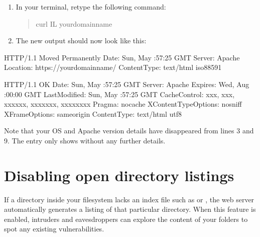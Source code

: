 \documentclass[a4paper,10pt,english,openany,oneside]{sphinxmanual}
\begin{document}
\begin{enumerate}
\item {} 
\sphinxAtStartPar
In your terminal, retype the following command:
\begin{quote}

\begin{sphinxVerbatim}[commandchars=\\\{\}]
\PYGZdl{} curl \PYGZhy{}IL your\PYGZhy{}domain\PYGZhy{}name
\end{sphinxVerbatim}
\end{quote}

\item {} 
\sphinxAtStartPar
The new output should now look like this:

\end{enumerate}

\begin{sphinxVerbatim}[commandchars=\\\{\},numbers=left,firstnumber=1,stepnumber=1]
HTTP/1.1  Moved Permanently
Date: Sun,  May  :57:25 GMT
Server: Apache
Location: https://your\PYGZhy{}domain\PYGZhy{}name/
Content\PYGZhy{}Type: text/html iso\PYGZhy{}8859\PYGZhy{}1

HTTP/1.1  OK
Date: Sun,  May  :57:25 GMT
Server: Apache
Expires: Wed,  Aug  :00:00 GMT
Last\PYGZhy{}Modified: Sun,  May  :57:25 GMT
Cache\PYGZhy{}Control: xxx, xxx, xxx\PYGZhy{}xxx, xxxxxxx, xxxxxxxx
Pragma: no\PYGZhy{}cache
X\PYGZhy{}Content\PYGZhy{}Type\PYGZhy{}Options: nosniff
X\PYGZhy{}Frame\PYGZhy{}Options: sameorigin
Content\PYGZhy{}Type: text/html utf\PYGZhy{}8
\end{sphinxVerbatim}

\sphinxAtStartPar
Note that your OS and Apache version details have disappeared from lines 3 and 9. The  entry only shows  without any further details.


\section{Disabling open directory listings}
\label{\detokenize{hardening-apache:disabling-open-directory-listings}}
\sphinxAtStartPar
If a directory inside your filesystem lacks an index file such as  or , the web server automatically generates a listing of that particular directory. When this feature is enabled, intruders and eavesdroppers can explore the content of your folders to spot any existing vulnerabilities.
\end{document}
